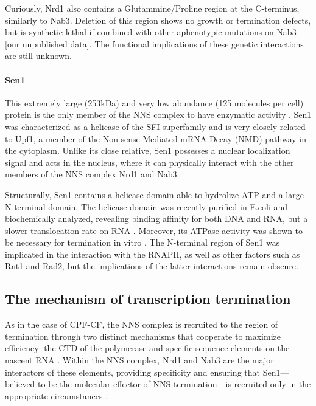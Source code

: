 Curiously, Nrd1 also contains a Glutammine/Proline region at the C-terminus, similarly to Nab3. 
Deletion of this region shows no growth or termination defects, but is synthetic lethal if combined with other aphenotypic mutations on Nab3 [our unpublished data]. 
The functional implications of these genetic interactions are still unknown.
 

\paragraph{Sen1}

This extremely large (253kDa) and very low abundance (125 molecules per cell) protein is the only member of the NNS complex to have enzymatic activity \cite{steinmetz:1996:repression}. 
Sen1 was characterized as a helicase of the SFI superfamily and is very closely related to Upf1, a member of the Non-sense Mediated mRNA Decay (NMD) pathway in the cytoplasm. 
Unlike its close relative, Sen1 possesses a nuclear localization signal and acts in the nucleus, where it can physically interact with the other members of the NNS complex Nrd1 and Nab3. 

Structurally, Sen1 contains a helicase domain able to hydrolize ATP and a large N terminal domain. 
The helicase domain was recently purified in E.coli and biochemically analyzed, revealing binding affinity for both DNA and RNA, but a slower translocation rate on RNA \cite{martintumasz:2015:saccharomyces}. 
Moreover, its ATPase activity was shown to be necessary for termination in vitro \cite{porrua:2013:bacteriallike}. 
The N-terminal region of Sen1 was implicated in the interaction with the RNAPII, as well as other factors such as Rnt1 and Rad2, but the implications of the latter interactions remain obscure.

\subsection{The mechanism of transcription termination}

As in the case of CPF-CF, the NNS complex is recruited to the region of termination through two distinct mechanisms that cooperate to maximize efficiency: the CTD of the polymerase \cite{vasiljeva:2008:nrd1nab3sen1} and specific sequence elements on the nascent RNA \cite{conrad:2000:yeast}. 
Within the NNS complex, Nrd1 and Nab3 are the major interactors of these elements, providing specificity and ensuring that Sen1---believed to be the molecular effector of NNS termination---is recruited only in the appropriate circumstances \cite{porrua:2013:bacteriallike}.

